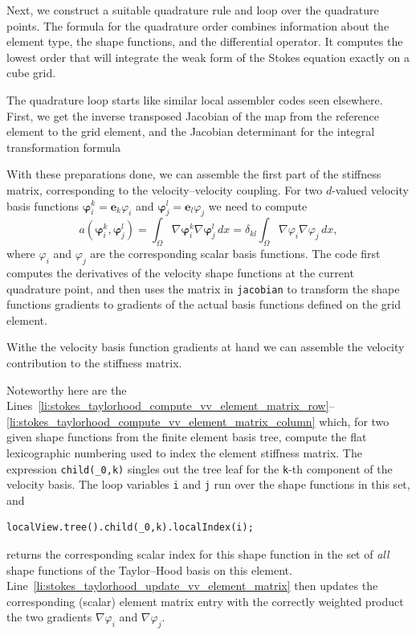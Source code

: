 \documentclass[a4paper,10pt,headings=normal,bibliography=totoc]{scrartcl}
\newcommand{\cpp}[1]{\lstinline[basicstyle=\ttfamily]!#1!}
\begin{document}
Next, we construct a suitable quadrature rule and loop over the quadrature points.  The formula for the quadrature
order combines information about the element type, the shape functions, and the differential operator.
It computes the lowest order that will integrate the weak form of the Stokes equation exactly
on a cube grid.
%

%
The quadrature loop starts like similar local assembler codes seen elsewhere.
First, we get the inverse transposed Jacobian
of the map from the reference element to the grid element, and the Jacobian determinant for the integral
transformation formula
%

%
With these preparations done, we can assemble the first part of the stiffness matrix,  corresponding to the
velocity--velocity coupling.  For two $d$-valued velocity basis functions $\bm{\varphi}_i^k = \mathbf{e}_k \varphi_i$
and $\bm{\varphi}_j^l = \mathbf{e}_l \varphi_j$ we need to compute
\begin{equation*}
 a(\bm{\varphi}_i^k, \bm{\varphi}_j^l)
 =
 \int_\Omega \nabla \bm{\varphi}_i^k \nabla \bm{\varphi}_j^l \,dx
 =
 \delta_{kl} \int_\Omega \nabla \varphi_i \nabla \varphi_j \,dx,
\end{equation*}
where $\varphi_i$ and $\varphi_j$ are the corresponding scalar basis functions.
The code first computes the derivatives of the velocity
shape functions at the current quadrature point,
and then uses the matrix in \cpp{jacobian} to transform the shape functions gradients to
gradients of the actual basis functions defined on the grid element.
%

%
Withe the velocity basis function gradients at hand we can assemble the velocity contribution
to the stiffness matrix.
%

%
Noteworthy here are the Lines~\ref{li:stokes_taylorhood_compute_vv_element_matrix_row}--\ref{li:stokes_taylorhood_compute_vv_element_matrix_column} which,
for two given shape functions from the finite element basis tree, compute the flat lexicographic numbering
used to index the element stiffness matrix.  The expression \cpp{child(_0,k)} singles out the tree leaf
for the \cpp{k}-th component of the velocity basis.  The loop variables \cpp{i} and \cpp{j} run over
the shape functions in this set, and
\begin{lstlisting}[style=Example]
localView.tree().child(_0,k).localIndex(i);
\end{lstlisting}
returns the corresponding scalar index for this shape function in the set of {\em all} shape functions
of the Taylor--Hood basis on this element.  Line~\ref{li:stokes_taylorhood_update_vv_element_matrix} then updates the corresponding (scalar)
element matrix entry with the correctly weighted product the two gradients $\nabla \varphi_i$
and $\nabla \varphi_j$.
\end{document}
